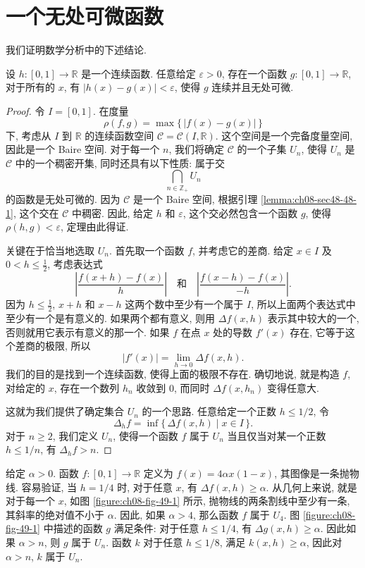 ﻿\section{一个无处可微函数}
\label{section:ch08-sec49}

我们证明数学分析中的下述结论.

\begin{theorem}
\label{theorem:ch08-sec49-49-1}
设 $h\colon[0,1]\to\mathbb{R}$ 是一个连续函数. 任意给定 $\varepsilon>0$, 存在一个函数 $g\colon[0,1]\to\mathbb{R}$, 对于所有的 $x$, 有 $|h(x)-g(x)|<\varepsilon$, 使得 $g$ 连续并且无处可微.
\end{theorem}

\begin{proof}
令 $I=[0,1]$. 在度量
\[
\rho(f,g)=\max\{\,|f(x)-g(x)|\,\}
\]
下, 考虑从 $I$ 到 $\mathbb{R}$ 的连续函数空间 $\mathcal{C}=\mathcal{C}(I,\mathbb{R})$. 这个空间是一个完备度量空间, 因此是一个 Baire 空间. 对于每一个 $n$, 我们将确定 $\mathcal{C}$ 的一个子集 $U_n$, 使得 $U_n$ 是 $\mathcal{C}$ 中的一个稠密开集, 同时还具有以下性质: 属于交
\[
\bigcap_{n\in\mathbb{Z}_{+}}U_{n}
\]
的函数是无处可微的. 因为 $\mathcal{C}$ 是一个 Baire 空间, 根据引理 \cref{lemma:ch08-sec48-48-1}, 这个交在 $\mathcal{C}$ 中稠密. 因此, 给定 $h$ 和 $\varepsilon$, 这个交必然包含一个函数 $g$, 使得 $\rho(h,g)<\varepsilon$, 定理由此得证.

关键在于恰当地选取 $U_n$. 首先取一个函数 $f$, 并考虑它的差商. 给定 $x\in I$ 及 $0<h\leqslant\frac{1}{2}$, 考虑表达式
\[
\left|\frac{f(x+h)-f(x)}{h}\right|\quad\text{和}\quad
\left|\frac{f(x-h)-f(x)}{-h}\right|.
\]
因为 $h\leqslant\frac{1}{2}$, $x+h$ 和 $x-h$ 这两个数中至少有一个属于 $I$, 所以上面两个表达式中至少有一个是有意义的. 如果两个都有意义, 则用 $\Delta f(x,h)$ 表示其中较大的一个, 否则就用它表示有意义的那一个. 如果 $f$ 在点 $x$ 处的导数 $f'(x)$ 存在, 它等于这个差商的极限, 所以
\[
|f'(x)|=\lim_{h\to 0}\Delta f(x,h).
\]
我们的目的是找到一个连续函数, 使得上面的极限不存在. 确切地说, 就是构造 $f$, 对给定的 $x$, 存在一个数列 $h_n$ 收敛到 $0$, 而同时 $\Delta f(x,h_n)$ 变得任意大.

这就为我们提供了确定集合 $U_n$ 的一个思路. 任意给定一个正数 $h\leqslant 1/2$, 令
\[
\Delta_{h}f=\inf\{\,\Delta f(x,h)\mid x\in I\,\}.
\]
对于 $n\geqslant 2$, 我们定义 $U_n$, 使得一个函数 $f$ 属于 $U_n$ 当且仅当对某一个正数 $h\leqslant 1/n$, 有 $\Delta_h f>n$.
\end{proof}

\begin{example}
\label{example:ch08-sec49-1}
给定 $\alpha>0$. 函数 $f\colon[0,1]\to\mathbb{R}$ 定义为 $f(x)=4\alpha x(1-x)$, 其图像是一条抛物线. 容易验证, 当 $h=1/4$ 时, 对于任意 $x$, 有 $\Delta f(x,h)\geqslant\alpha$. 从几何上来说, 就是对于每一个 $x$, 如图 \cref{figure:ch08-fig-49-1} 所示, 抛物线的两条割线中至少有一条, 其斜率的绝对值不小于 $\alpha$. 因此, 如果 $\alpha>4$, 那么函数 $f$ 属于 $U_4$. 图 \cref{figure:ch08-fig-49-1} 中描述的函数 $g$ 满足条件: 对于任意 $h\leqslant 1/4$, 有 $\Delta g(x,h)\geqslant\alpha$. 因此如果 $\alpha>n$, 则 $g$ 属于 $U_n$. 函数 $k$ 对于任意 $h\leqslant 1/8$, 满足 $k(x,h)\geqslant\alpha$, 因此对 $\alpha>n$, $k$ 属于 $U_n$.
\end{example}

